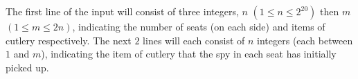 The first line of the input will consist of three integers, $n$ $(1 \le n \le 2^{20})$ then $m$ $(1 \le m \le 2n)$,
indicating the number of seats (on each side) and items of cutlery respectively.
The next $2$ lines will each consist of $n$ integers (each between $1$ and $m$),
indicating the item of cutlery that the spy in each seat has initially picked up.
